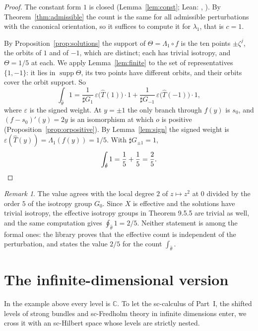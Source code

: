 \documentclass[11pt,a4paper]{article}
\theoremstyle{plain}
\theoremstyle{definition}
\theoremstyle{remark}
\newtheorem{remark}[theorem]{Remark}
\newcommand{\C}{\mathbb{C}}
\newcommand{\card}{\sharp}
\newcommand{\supp}{\operatorname{supp}}
\begin{document}
\begin{proof}
The constant form $1$ is closed (Lemma~\ref{lem:const}; Lean: , ). By
Theorem~\ref{thm:admissible} the count is the same for all admissible perturbations with the canonical
orientation, so it suffices to compute it for $\lambda_1$, that is $c=1$.

By Proposition~\ref{prop:solutions} the support of $\Theta=\Lambda_1\circ f$ is the ten points
$\pm\zeta^j$, the orbits of $1$ and of $-1$, which are distinct; each has trivial isotropy, and
$\Theta=1/5$ at each. We apply Lemma~\ref{lem:finite} to the set of representatives $\{1,-1\}$: it lies in
$\supp\Theta$, its two points have different orbits, and their orbits cover the orbit support. So
\[
  \int_{\hat\theta}1=\frac1{\card G_1}\,\varepsilon\bigl(\hat T(1)\bigr)\cdot1
  +\frac1{\card G_{-1}}\,\varepsilon\bigl(\hat T(-1)\bigr)\cdot1,
\]
where $\varepsilon$ is the signed weight. At $y=\pm1$ the only branch through $f(y)$ is $s_0$, and
$(f-s_0)'(y)=2y$ is an isomorphism at which $o$ is positive (Proposition~\ref{prop:orpositive}). By
Lemma~\ref{lem:sign} the signed weight is $\varepsilon(\hat T(y))=\Lambda_1(f(y))=1/5$. With
$\card G_{\pm1}=1$,
\[
  \int_{\hat\theta}1=\frac15+\frac15=\frac25 .\qedhere
\]
\end{proof}

\begin{remark}
The value agrees with the local degree $2$ of $z\mapsto z^2$ at $0$ divided by the order $5$ of the
isotropy group $G_0$. Since $X$ is effective and the solutions have trivial isotropy, the effective
isotropy groups in Theorem 9.5.5 are trivial as well, and the same computation gives
$\oint_{\hat\theta}1=2/5$. Neither statement is among the formal ones: the library proves that the
effective count is independent of the perturbation, and states the value $2/5$ for the count
$\int_{\hat\theta}$.
\end{remark}

\section{The infinite-dimensional version}\label{sec:inf}

In the example above every level is $\C$. To let the sc-calculus of Part~I, the shifted levels of strong
bundles and sc-Fredholm theory in infinite dimensions enter, we cross it with an sc-Hilbert space whose
levels are strictly nested.
\end{document}

